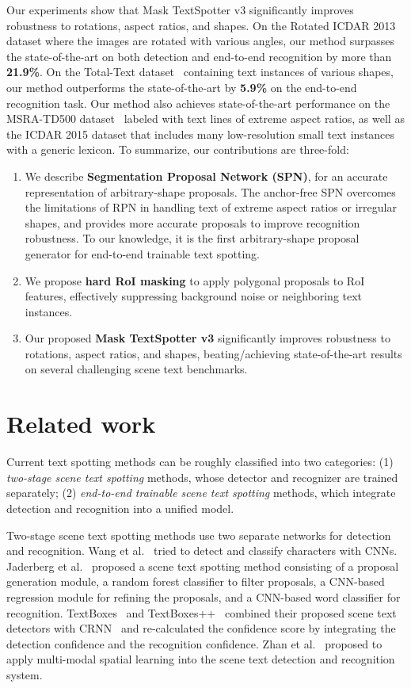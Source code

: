 \documentclass[runningheads]{llncs}
\newcommand{\minisection}[1]{\noindent{\textbf{#1}}}
\begin{document}
Our experiments show that Mask TextSpotter v3 significantly improves robustness to rotations, aspect ratios, and shapes. On the Rotated ICDAR 2013 dataset where the images are rotated with various angles, our method surpasses the state-of-the-art on both detection and end-to-end recognition by more than \textbf{21.9\%}. On the Total-Text dataset~\cite{total-text} containing text instances of various shapes, our method outperforms the state-of-the-art by \textbf{5.9\%} on the end-to-end recognition task. Our method also achieves state-of-the-art performance on the MSRA-TD500 dataset~\cite{MSRA} labeled with text lines of extreme aspect ratios, as well as the ICDAR 2015 dataset that includes many low-resolution small text instances with a generic lexicon.
To summarize, our contributions are three-fold:
\begin{enumerate}[itemsep=0ex]
    \item We describe {\bf Segmentation Proposal Network (SPN)}, for an accurate representation of arbitrary-shape proposals. 
    The anchor-free SPN overcomes the limitations of RPN in handling text of extreme aspect ratios or irregular shapes, and provides more accurate proposals to improve recognition robustness.
    To our knowledge, it is the first arbitrary-shape proposal generator for end-to-end trainable text spotting.
    \item We propose {\bf hard RoI masking} to apply polygonal proposals to RoI features, effectively suppressing background noise or neighboring text instances.
    \item Our proposed {\bf Mask TextSpotter v3} significantly improves robustness to rotations, aspect ratios, and shapes, beating/achieving state-of-the-art results on several challenging scene text benchmarks.
\end{enumerate}

\section{Related work}
Current text spotting methods can be roughly classified into two categories: (1) \emph{two-stage scene text spotting} methods, whose detector and recognizer are trained separately; (2) \emph{end-to-end trainable scene text spotting} methods, which integrate detection and recognition into a unified model.


\minisection{Two-stage scene text spotting}
Two-stage scene text spotting methods use two separate networks for detection and recognition. Wang et al.~\cite{WangWCN12} tried to detect and classify characters with CNNs. 
Jaderberg et al.~\cite{jaderberg2016reading} proposed a scene text spotting method consisting of a proposal generation module, a random forest classifier to filter proposals, a CNN-based regression module for refining the proposals, and a CNN-based word classifier for recognition.
TextBoxes~\cite{liao2017textboxes} and TextBoxes++~\cite{liao2018textboxes++} combined their proposed scene text detectors with CRNN~\cite{shi2016end} and re-calculated the confidence score by integrating the detection confidence and the recognition confidence. 
Zhan et al.~\cite{Zhan_2019_ICCV} proposed to apply multi-modal spatial learning into the scene text detection and recognition system.
\end{document}
